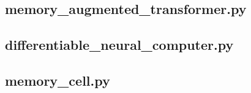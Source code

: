 \documentclass[draft,final]{vutinfth} %
\begin{document}
    \subsection{memory\_augmented\_transformer.py}
    

    \subsection{differentiable\_neural\_computer.py}
    

    \subsection{memory\_cell.py}
    



    \backmatter

    \listoffigures %

    \cleardoublepage %
    \listoftables %


    \printindex

    \printglossaries

    
    
\end{document}
